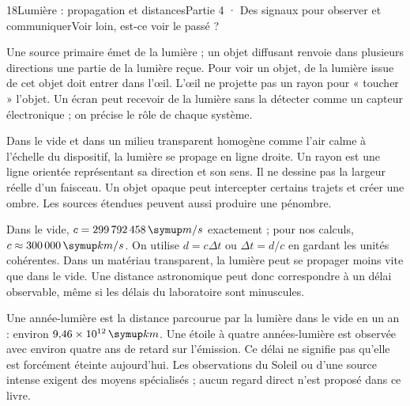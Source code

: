 \begin{ouverture}[college4]{18}{Lumière : propagation et distances}{Partie 4 · Des signaux pour observer et communiquer}{Voir loin, est-ce voir le passé ?}
\end{ouverture}
\label{ess-18}
Une source primaire émet de la lumière ; un objet diffusant renvoie dans plusieurs directions une partie de la lumière reçue. Pour voir un objet, de la lumière issue de cet objet doit entrer dans l’œil. L’œil ne projette pas un rayon pour « toucher » l’objet. Un écran peut recevoir de la lumière sans la détecter comme un capteur électronique ; on précise le rôle de chaque système.\par
{}
Dans le vide et dans un milieu transparent homogène comme l’air calme à l’échelle du dispositif, la lumière se propage en ligne droite. Un rayon est une ligne orientée représentant sa direction et son sens. Il ne dessine pas la largeur réelle d’un faisceau. Un objet opaque peut intercepter certains trajets et créer une ombre. Les sources étendues peuvent aussi produire une pénombre.\par
\clearpage
{}
Dans le vide, $c=299\,792\,458\unite{m/s}$ exactement ; pour nos calculs, $c\approx300\,000\unite{km/s}$. On utilise $d=c\Delta t$ ou $\Delta t=d/c$ en gardant les unités cohérentes. Dans un matériau transparent, la lumière peut se propager moins vite que dans le vide. Une distance astronomique peut donc correspondre à un délai observable, même si les délais du laboratoire sont minuscules.\par
{}
Une année-lumière est la distance parcourue par la lumière dans le vide en un an : environ $9{,}46\times10^{12}\unite{km}$. Une étoile à quatre années-lumière est observée avec environ quatre ans de retard sur l’émission. Ce délai ne signifie pas qu’elle est forcément éteinte aujourd’hui. Les observations du Soleil ou d’une source intense exigent des moyens spécialisés ; aucun regard direct n’est proposé dans ce livre.\par
